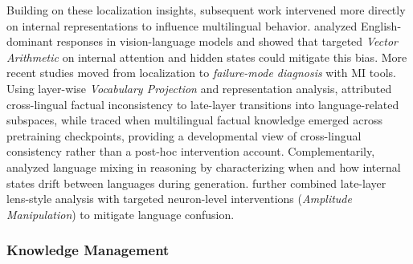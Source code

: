 \documentclass[11pt,letterpaper]{mystyle}
\begin{document}
  Building on these localization insights, subsequent work intervened more directly on internal representations to influence multilingual behavior. \citet{hinck-etal-2024-llava} analyzed English-dominant responses in vision-language models and showed that targeted \textit{Vector Arithmetic} on internal attention and hidden states could mitigate this bias. 
  More recent studies moved from localization to \emph{failure-mode diagnosis} with MI tools. Using layer-wise \textit{Vocabulary Projection} and representation analysis, \citet{wang-etal-2025-lost-multilinguality} attributed cross-lingual factual inconsistency to late-layer transitions into language-related subspaces, while \citet{liu-etal-2025-tracing} traced when multilingual factual knowledge emerged across pretraining checkpoints, providing a developmental view of cross-lingual consistency rather than a post-hoc intervention account.
  Complementarily, \citet{wang-etal-2025-language-mixing} analyzed language mixing in reasoning by characterizing when and how internal states drift between languages during generation. \citet{nie-etal-2025-mechanistic} further combined late-layer lens-style analysis with targeted neuron-level interventions (\textit{Amplitude Manipulation}) to mitigate language confusion. 

\subsubsection{Knowledge Management}
\label{sec:knowledge_management}
\end{document}
